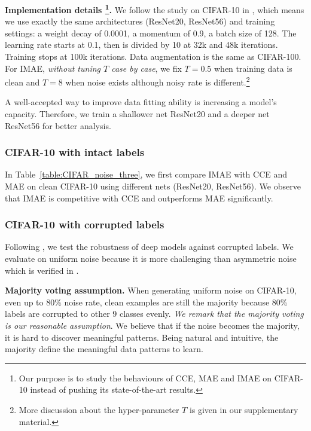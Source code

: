 \documentclass{article}
\begin{document}
\noindent
\textbf{Implementation details \footnote{Our purpose is to study the behaviours of CCE, MAE and IMAE  on CIFAR-10 instead of pushing its state-of-the-art results.}.}
We follow the study on CIFAR-10 in \cite{he2016deep}, which means we use exactly the same architectures (ResNet20, ResNet56) and training settings: a weight decay of 0.0001, a momentum of 0.9, a batch size of 128. The learning rate starts at 0.1, then is divided by 10 at 32k and 48k iterations. Training stops at 100k iterations. 
{Data augmentation is the same as CIFAR-100.}
For IMAE, \textit{without tuning $T$ case by case}, we fix $T=0.5$ when training data is clean and $T=8$ when noise exists although noisy rate is different.\footnote{More discussion about the hyper-parameter $T$ is given in our supplementary material.}

A well-accepted way to improve data fitting ability is increasing a model's capacity. Therefore, we train a shallower net ResNet20 and a deeper net ResNet56 
for better analysis. 






\subsubsection{CIFAR-10 with intact labels}
In Table~\ref{table:CIFAR_noise_three}, we first compare IMAE with CCE and MAE on clean CIFAR-10 using different nets (ResNet20, ResNet56). 
We observe that IMAE is competitive with CCE and outperforms MAE significantly.

\subsubsection{CIFAR-10 with corrupted labels}
Following \cite{zhang2017understanding,arpit2017closer}, we test the robustness of deep models against corrupted labels. 
We evaluate on uniform noise because it is more challenging than asymmetric noise which is verified in \cite{vahdat2017toward}. 
 



\noindent 
\textbf{Majority voting assumption.}
When generating uniform noise on CIFAR-10, even up to 80\% noise rate, clean examples are still the majority because 80\% labels are corrupted to other 9 classes evenly. 
\textit{We remark that the majority voting is our reasonable assumption}. We believe that if the noise becomes the majority, it is hard to discover meaningful patterns. Being natural and intuitive, the majority define the meaningful data patterns to learn.
\end{document}
